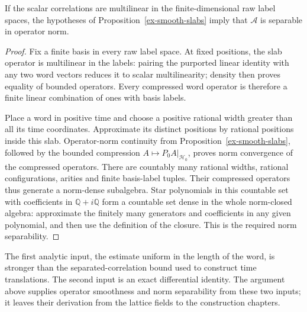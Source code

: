 \begin{corollary}
\label{ex-norm-separable}
If the scalar correlations are multilinear in the finite-dimensional raw
label spaces, the hypotheses of Proposition~\ref{ex-smooth-slabs} imply
that \(\mathcal A\) is separable in operator norm.
\end{corollary}
\begin{proof}
Fix a finite basis in every raw label space. At fixed positions, the slab
operator is multilinear in the labels: pairing the purported linear
identity with any two word vectors reduces it to scalar multilinearity;
density then proves equality of bounded operators. Every compressed word
operator is therefore a finite linear combination of ones with basis
labels.

Place a word in positive time and choose a positive rational width
greater than all its time coordinates. Approximate its distinct positions
by rational positions inside this slab. Operator-norm continuity from
Proposition~\ref{ex-smooth-slabs}, followed by the bounded compression
\(A\mapsto P_0A|_{\mathcal H_0}\), proves norm convergence of the
compressed operators. There are countably many rational widths, rational
configurations, arities and finite basis-label tuples. Their compressed
operators thus generate a norm-dense subalgebra. Star polynomials in this
countable set with coefficients in \(\mathbb Q+i\mathbb Q\) form a
countable set dense in the whole norm-closed algebra: approximate the
finitely many generators and coefficients in any given polynomial, and
then use the definition of the closure. This is the required norm
separability.
\end{proof}

The first analytic input, the estimate uniform in the length of the word,
is stronger than the separated-correlation bound used to construct time
translations. The second input is an exact differential identity. The
argument above supplies operator smoothness and norm separability from
these two inputs; it leaves their derivation from the lattice fields to
the construction chapters.
